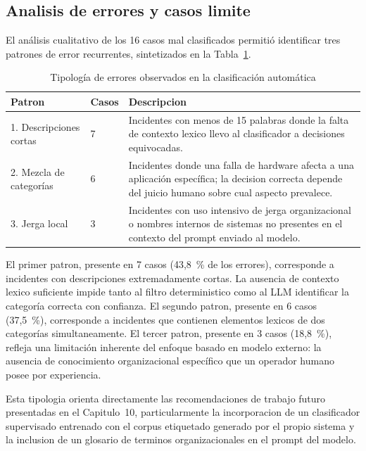 \subsection{Analisis de errores y casos limite}

El análisis cualitativo de los 16 casos mal clasificados permitió identificar tres patrones de error recurrentes, sintetizados en la Tabla~\ref{tab:errores}.

\begin{table}[htbp]
\centering
\caption{Tipología de errores observados en la clasificación automática}
\label{tab:errores}
\small
\begin{tabular}{@{}p{2.0cm} p{1.3cm} >{\raggedright\arraybackslash}p{10.0cm}@{}}
\toprule
\textbf{Patron} & \textbf{Casos} & \textbf{Descripcion} \\
\midrule
1. Descripciones cortas & 7 & Incidentes con menos de 15 palabras donde la falta de contexto lexico llevo al clasificador a decisiones equivocadas. \\
2. Mezcla de categorías & 6 & Incidentes donde una falla de hardware afecta a una aplicación específica; la decision correcta depende del juicio humano sobre cual aspecto prevalece. \\
3. Jerga local & 3 & Incidentes con uso intensivo de jerga organizacional o nombres internos de sistemas no presentes en el contexto del prompt enviado al modelo. \\
\bottomrule
\end{tabular}
\end{table}

El primer patron, presente en 7 casos (43,8~\% de los errores), corresponde a incidentes con descripciones extremadamente cortas. La ausencia de contexto lexico suficiente impide tanto al filtro deterministico como al LLM identificar la categoría correcta con confianza. El segundo patron, presente en 6 casos (37,5~\%), corresponde a incidentes que contienen elementos lexicos de dos categorías simultaneamente. El tercer patron, presente en 3 casos (18,8~\%), refleja una limitación inherente del enfoque basado en modelo externo: la ausencia de conocimiento organizacional específico que un operador humano posee por experiencia.

Esta tipologia orienta directamente las recomendaciones de trabajo futuro presentadas en el Capitulo~10, particularmente la incorporacion de un clasificador supervisado entrenado con el corpus etiquetado generado por el propio sistema y la inclusion de un glosario de terminos organizacionales en el prompt del modelo.

\newpage
